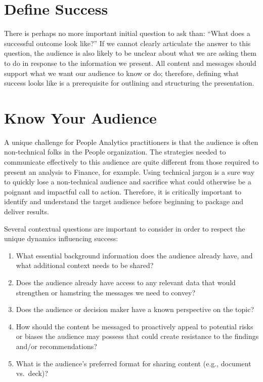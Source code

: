 \documentclass[
]{book}
\providecommand{\tightlist}{%
  \setlength{\itemsep}{0pt}\setlength{\parskip}{0pt}}
\begin{document}
\hypertarget{define-success}{%
\section{Define Success}\label{define-success}}

There is perhaps no more important initial question to ask than: ``What does a successful outcome look like?'' If we cannot clearly articulate the answer to this question, the audience is also likely to be unclear about what we are asking them to do in response to the information we present. All content and messages should support what we want our audience to know or do; therefore, defining what success looks like is a prerequisite for outlining and structuring the presentation.

\hypertarget{know-your-audience}{%
\section{Know Your Audience}\label{know-your-audience}}

A unique challenge for People Analytics practitioners is that the audience is often non-technical folks in the People organization. The strategies needed to communicate effectively to this audience are quite different from those required to present an analysis to Finance, for example. Using technical jargon is a sure way to quickly lose a non-technical audience and sacrifice what could otherwise be a poignant and impactful call to action. Therefore, it is critically important to identify and understand the target audience before beginning to package and deliver results.

Several contextual questions are important to consider in order to respect the unique dynamics influencing success:

\begin{enumerate}
\def\labelenumi{\arabic{enumi}.}
\tightlist
\item
  What essential background information does the audience already have, and what additional context needs to be shared?
\item
  Does the audience already have access to any relevant data that would strengthen or hamstring the messages we need to convey?
\item
  Does the audience or decision maker have a known perspective on the topic?
\item
  How should the content be messaged to proactively appeal to potential risks or biases the audience may possess that could create resistance to the findings and/or recommendations?
\item
  What is the audience's preferred format for sharing content (e.g., document vs.~deck)?
\end{enumerate}
\end{document}
